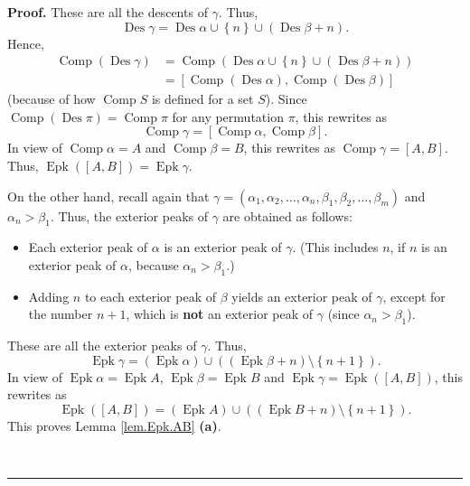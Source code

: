 \documentclass[numbers=enddot,12pt,final,onecolumn,notitlepage]{scrartcl}%
\theoremstyle{definition}
\newenvironment{proof}[1][Proof]{\noindent\textbf{#1.} }{\ \rule{0.5em}{0.5em}}
\newenvironment{verlong}{}{}
\begin{document}
\begin{verlong}
\begin{proof}
These are all the descents of $\gamma$. Thus,%
\[
\operatorname*{Des}\gamma=\operatorname*{Des}\alpha\cup\left\{  n\right\}
\cup\left(  \operatorname*{Des}\beta+n\right)  .
\]
Hence,%
\begin{align*}
\operatorname*{Comp}\left(  \operatorname*{Des}\gamma\right)   &
=\operatorname*{Comp}\left(  \operatorname*{Des}\alpha\cup\left\{  n\right\}
\cup\left(  \operatorname*{Des}\beta+n\right)  \right) \\
&  =\left[  \operatorname*{Comp}\left(  \operatorname*{Des}\alpha\right)
,\operatorname*{Comp}\left(  \operatorname*{Des}\beta\right)  \right]
\end{align*}
(because of how $\operatorname*{Comp}S$ is defined for a set $S$). Since
$\operatorname*{Comp}\left(  \operatorname*{Des}\pi\right)
=\operatorname*{Comp}\pi$ for any permutation $\pi$, this rewrites as%
\[
\operatorname*{Comp}\gamma=\left[  \operatorname*{Comp}\alpha
,\operatorname*{Comp}\beta\right]  .
\]
In view of $\operatorname*{Comp}\alpha=A$ and $\operatorname*{Comp}\beta=B$,
this rewrites as $\operatorname*{Comp}\gamma=\left[  A,B\right]  $. Thus,
$\operatorname*{Epk}\left(  \left[  A,B\right]  \right)  =\operatorname*{Epk}%
\gamma$.

On the other hand, recall again that $\gamma=\left(  \alpha_{1},\alpha
_{2},\ldots,\alpha_{n},\beta_{1},\beta_{2},\ldots,\beta_{m}\right)  $ and
$\alpha_{n}>\beta_{1}$. Thus, the exterior peaks of $\gamma$ are obtained as follows:

\begin{itemize}
\item Each exterior peak of $\alpha$ is an exterior peak of $\gamma$. (This
includes $n$, if $n$ is an exterior peak of $\alpha$, because $\alpha
_{n}>\beta_{1}$.)

\item Adding $n$ to each exterior peak of $\beta$ yields an exterior peak of
$\gamma$, except for the number $n+1$, which is \textbf{not} an exterior peak
of $\gamma$ (since $\alpha_{n}>\beta_{1}$).
\end{itemize}

These are all the exterior peaks of $\gamma$. Thus,%
\[
\operatorname*{Epk}\gamma=\left(  \operatorname*{Epk}\alpha\right)
\cup\left(  \left(  \operatorname*{Epk}\beta+n\right)  \setminus\left\{
n+1\right\}  \right)  .
\]
In view of $\operatorname*{Epk}\alpha=\operatorname*{Epk}A$,
$\operatorname*{Epk}\beta=\operatorname*{Epk}B$ and $\operatorname*{Epk}%
\gamma=\operatorname*{Epk}\left(  \left[  A,B\right]  \right)  $, this
rewrites as
\[
\operatorname*{Epk}\left(  \left[  A,B\right]  \right)  =\left(
\operatorname*{Epk}A\right)  \cup\left(  \left(  \operatorname*{Epk}%
B+n\right)  \setminus\left\{  n+1\right\}  \right)  .
\]
This proves Lemma \ref{lem.Epk.AB} \textbf{(a)}.


\end{proof}
\end{verlong}
\end{document}
